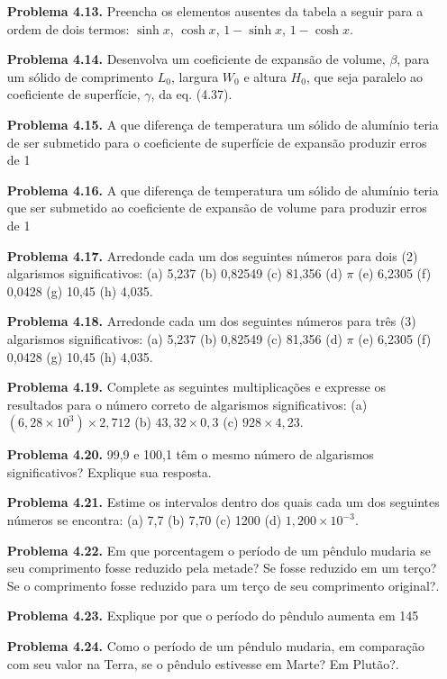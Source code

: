 \begin{enumerate}
    \item[\textbf{Problema 4.13.}] Preencha os elementos ausentes da tabela a seguir para a ordem de dois termos: $\sinh x$, $\cosh x$, $1 - \sinh x$, $1 - \cosh x$.
    \item[\textbf{Problema 4.14.}] Desenvolva um coeficiente de expansão de volume, $\beta$, para um sólido de comprimento $L_0$, largura $W_0$ e altura $H_0$, que seja paralelo ao coeficiente de superfície, $\gamma$, da eq. (4.37).
    \item[\textbf{Problema 4.15.}] A que diferença de temperatura um sólido de alumínio teria de ser submetido para o coeficiente de superfície de expansão produzir erros de 1%
    \item[\textbf{Problema 4.16.}] A que diferença de temperatura um sólido de alumínio teria que ser submetido ao coeficiente de expansão de volume para produzir erros de 1%
    \item[\textbf{Problema 4.17.}] Arredonde cada um dos seguintes números para dois (2) algarismos significativos: (a) 5,237 (b) 0,82549 (c) 81,356 (d) $\pi$ (e) 6,2305 (f) 0,0428 (g) 10,45 (h) 4,035.
    \item[\textbf{Problema 4.18.}] Arredonde cada um dos seguintes números para três (3) algarismos significativos: (a) 5,237 (b) 0,82549 (c) 81,356 (d) $\pi$ (e) 6,2305 (f) 0,0428 (g) 10,45 (h) 4,035.
    \item[\textbf{Problema 4.19.}] Complete as seguintes multiplicações e expresse os resultados para o número correto de algarismos significativos: (a) $(6,28 \times 10^3) \times 2,712$ (b) $43,32 \times 0,3$ (c) $928 \times 4,23$.
    \item[\textbf{Problema 4.20.}] 99,9 e 100,1 têm o mesmo número de algarismos significativos? Explique sua resposta.
    \item[\textbf{Problema 4.21.}] Estime os intervalos dentro dos quais cada um dos seguintes números se encontra: (a) 7,7 (b) 7,70 (c) 1200 (d) $1,200 \times 10^{-3}$.
    \item[\textbf{Problema 4.22.}] Em que porcentagem o período de um pêndulo mudaria se seu comprimento fosse reduzido pela metade? Se fosse reduzido em um terço? Se o comprimento fosse reduzido para um terço de seu comprimento original?.
    \item[\textbf{Problema 4.23.}] Explique por que o período do pêndulo aumenta em 145%
    \item[\textbf{Problema 4.24.}] Como o período de um pêndulo mudaria, em comparação com seu valor na Terra, se o pêndulo estivesse em Marte? Em Plutão?.

\end{enumerate}

